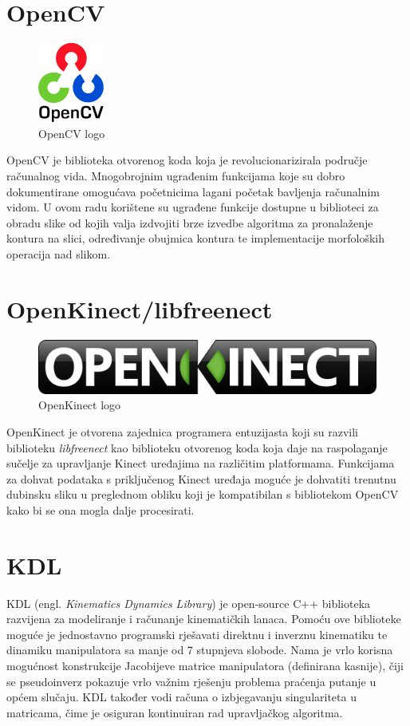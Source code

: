 \documentclass[times, utf8, diplomski, numeric]{fer}
\begin{document}
\section{OpenCV}
\begin{figure}[h!]
\centering
\includegraphics[scale=0.4]{logo_opencv}
\caption{OpenCV logo}
\end{figure}
OpenCV je biblioteka otvorenog koda koja je revolucionarizirala područje računalnog vida. Mnogobrojnim ugrađenim funkcijama koje su dobro dokumentirane omogućava početnicima lagani početak bavljenja računalnim vidom. U ovom radu korištene su ugrađene funkcije dostupne u biblioteci za obradu slike od kojih valja izdvojiti brze izvedbe algoritma za pronalaženje kontura na slici, određivanje obujmica kontura te implementacije morfoloških operacija nad slikom.

\section{OpenKinect/libfreenect}
\begin{figure}[h!]
\centering
\includegraphics[scale=0.4]{logo_openkinect}
\caption{OpenKinect logo}
\end{figure}
OpenKinect je otvorena zajednica programera entuzijasta koji su razvili biblioteku \textit{libfreenect} kao biblioteku otvorenog koda koja daje na raspolaganje sučelje za upravljanje Kinect uređajima na različitim platformama. Funkcijama za dohvat podataka s priključenog Kinect uređaja moguće je dohvatiti trenutnu dubinsku sliku u preglednom obliku koji je kompatibilan s bibliotekom OpenCV kako bi se ona mogla dalje procesirati.

\section{KDL}
KDL (engl. \textit{Kinematics Dynamics Library}) je open-source C++ biblioteka razvijena za modeliranje i računanje kinematičkih lanaca.
Pomoću ove biblioteke moguće je jednostavno programski rješavati direktnu i inverznu kinematiku te dinamiku manipulatora sa manje od 7 stupnjeva slobode.
Nama je vrlo korisna mogućnost konstrukcije Jacobijeve matrice manipulatora (definirana kasnije), čiji se pseudoinverz pokazuje vrlo važnim rješenju problema praćenja putanje u općem slučaju.
KDL također vodi računa o izbjegavanju singulariteta u matricama, čime je osiguran kontinuiran rad upravljačkog algoritma.
\end{document}

